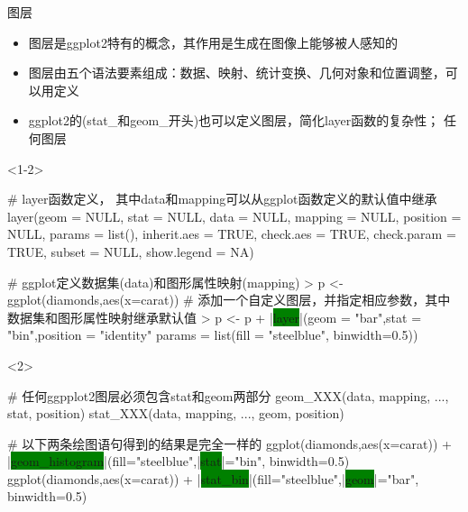\begin{frame}[t,fragile]{\subsecname}{图层}
\begin{itemize}
\item<1-> 图层是ggplot2特有的概念，其作用是生成在图像上能够被人感知的
\item<1-> 图层由五个语法要素组成：数据、映射、统计变换、几何对象和位置调整，可以用定义
\item<2-> ggplot2的(stat\_和geom\_开头)也可以定义图层，简化layer函数的复杂性；
任何图层
\end{itemize}

\begin{overlayarea}{\textwidth}{\textheight}
\begin{onlyenv}<1-2>
\begin{rcode}
# layer函数定义， 其中data和mapping可以从ggplot函数定义的默认值中继承
layer(geom = NULL, stat = NULL, data = NULL, mapping = NULL,
  position = NULL, params = list(), inherit.aes = TRUE,
  check.aes = TRUE, check.param = TRUE, subset = NULL, show.legend = NA)

# ggplot定义数据集(data)和图形属性映射(mapping)
> p <- ggplot(diamonds,aes(x=carat))
# 添加一个自定义图层，并指定相应参数，其中数据集和图形属性映射继承默认值
> p <- p + |\colorbox{green}{layer}|(geom = "bar",stat = "bin",position = "identity"
    params = list(fill = "steelblue", binwidth=0.5))
\end{rcode}
\end{onlyenv}

\begin{onlyenv}<2>
\begin{rcode}
# 任何ggpplot2图层必须包含stat和geom两部分
geom_XXX(data, mapping, ..., stat, position)
stat_XXX(data, mapping, ..., geom, position)

# 以下两条绘图语句得到的结果是完全一样的
ggplot(diamonds,aes(x=carat)) + |\colorbox{green}{geom\_histogram}|(fill="steelblue",|\colorbox{green}{stat}|="bin", binwidth=0.5)
ggplot(diamonds,aes(x=carat)) + |\colorbox{green}{stat\_bin}|(fill="steelblue",|\colorbox{green}{geom}|="bar", binwidth=0.5)
\end{rcode} 
\end{onlyenv}
\end{overlayarea}
\end{frame}

